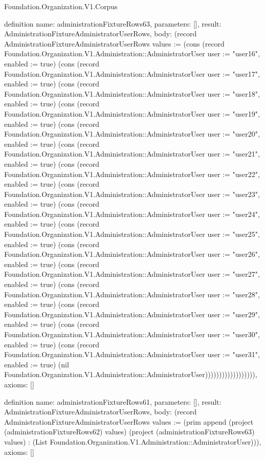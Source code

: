 \begin{lexlean}{Foundation.Organization.V1.Corpus}
\begin{semanticmodule}
definition{
  name: administrationFixtureRows63,
  parameters: [],
  result: AdministrationFixtureAdministratorUserRows,
  body: (record AdministrationFixtureAdministratorUserRows {values := (cons (record Foundation.Organization.V1.Administration::AdministratorUser {user := "user16", enabled := true}) (cons (record Foundation.Organization.V1.Administration::AdministratorUser {user := "user17", enabled := true}) (cons (record Foundation.Organization.V1.Administration::AdministratorUser {user := "user18", enabled := true}) (cons (record Foundation.Organization.V1.Administration::AdministratorUser {user := "user19", enabled := true}) (cons (record Foundation.Organization.V1.Administration::AdministratorUser {user := "user20", enabled := true}) (cons (record Foundation.Organization.V1.Administration::AdministratorUser {user := "user21", enabled := true}) (cons (record Foundation.Organization.V1.Administration::AdministratorUser {user := "user22", enabled := true}) (cons (record Foundation.Organization.V1.Administration::AdministratorUser {user := "user23", enabled := true}) (cons (record Foundation.Organization.V1.Administration::AdministratorUser {user := "user24", enabled := true}) (cons (record Foundation.Organization.V1.Administration::AdministratorUser {user := "user25", enabled := true}) (cons (record Foundation.Organization.V1.Administration::AdministratorUser {user := "user26", enabled := true}) (cons (record Foundation.Organization.V1.Administration::AdministratorUser {user := "user27", enabled := true}) (cons (record Foundation.Organization.V1.Administration::AdministratorUser {user := "user28", enabled := true}) (cons (record Foundation.Organization.V1.Administration::AdministratorUser {user := "user29", enabled := true}) (cons (record Foundation.Organization.V1.Administration::AdministratorUser {user := "user30", enabled := true}) (cons (record Foundation.Organization.V1.Administration::AdministratorUser {user := "user31", enabled := true}) (nil Foundation.Organization.V1.Administration::AdministratorUser)))))))))))))))))}),
  axioms: []
}

definition{
  name: administrationFixtureRows61,
  parameters: [],
  result: AdministrationFixtureAdministratorUserRows,
  body: (record AdministrationFixtureAdministratorUserRows {values := (prim append (project (administrationFixtureRows62) values) (project (administrationFixtureRows63) values) : (List Foundation.Organization.V1.Administration::AdministratorUser))}),
  axioms: []
}


\end{semanticmodule}
\end{lexlean}
